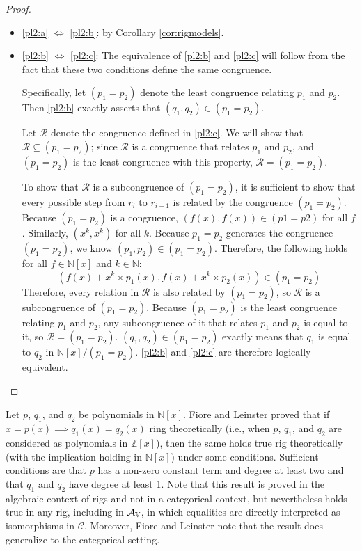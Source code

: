 \documentclass{msthesis}
\theoremstyle{definition}
\newcommand{\nat}{\mathbb{N}}
\newcommand{\mcC}{\mathcal{C}}
\begin{document}
\begin{proof} \hfill
    \begin{itemize}[nosep]
\item \ref{pl2:a} $\iff$ \ref{pl2:b}: by Corollary \ref{cor:rigmodels}.
\item \ref{pl2:b} $\iff$ \ref{pl2:c}: The equivalence of \ref{pl2:b} and \ref{pl2:c} will follow from the fact that these two conditions define the same congruence.

   Specifically, let $(p_1 = p_2)$ denote the least congruence relating $p_1$ and $p_2$. Then \ref{pl2:b} exactly asserts that $(q_1,q_2) \in (p_1=p_2)$.

   Let $\mathcal{R}$ denote the congruence defined in \ref{pl2:c}. We will show that $\mathcal{R} \subseteq (p_1=p_2)$; since $\mathcal{R}$ is a congruence that relates $p_1$ and $p_2$, and $(p_1 = p_2)$ is the least congruence with this property, $\mathcal{R} = (p_1 = p_2)$.
   
    To show that $\mathcal{R}$ is a subcongruence of $(p_1 = p_2)$, it is sufficient to show that every possible step from $r_i$ to $r_{i+1}$ is related by the congruence $(p_1 = p_2)$.  Because $(p_1 = p_2)$ is a congruence, $(f(x), f(x)) \in (p1 = p2)$ for all $f$.  Similarly, $(x^k, x^k)$ for all $k$. Because $p_1 = p_2$ generates the congruence $(p_1 = p_2)$, we know $(p_1, p_2) \in (p_1 = p_2)$. Therefore, the following holds for all $f \in \nat[x]$ and $k \in \nat$:
    \[ (f(x) + x^k\times p_1(x) , f(x) + x^k \times p_2(x)) \in (p_1 = p_2) \]
    Therefore, every relation in $\mathcal{R}$ is also related by $(p_1 = p_2)$, so $\mathcal{R}$ is a subcongruence of $(p_1 = p_2)$.  Because $(p_1 = p_2)$ is the least congruence relating $p_1$ and $p_2$, any subcongruence of it that relates $p_1$ and $p_2$ is equal to it, so $\mathcal{R} = (p_1 = p_2)$. $(q_1, q_2) \in (p_1 = p_2)$ exactly means that $q_1$ is equal to $q_2$ in $\nat[x]/(p_1 = p_2)$.  \ref{pl2:b} and \ref{pl2:c} are therefore logically equivalent. \qedhere    
\end{itemize}
\end{proof}

Let $p$, $q_1$, and $q_2$ be polynomials in $\nat[x]$. Fiore and Leinster proved that if $x = p(x) \implies q_1(x) = q_2(x)$ ring theoretically (i.e., when $p$, $q_1$, and $q_2$ are considered as polynomials in $\mathbb{Z}[x]$), then the same holds true rig theoretically (with the implication holding in $\nat[x]$) under some conditions.
Sufficient conditions are that $p$ has a non-zero constant term and degree at least two and that $q_1$ and $q_2$ have degree at least 1.  Note that this result is proved in the algebraic context of rigs and not in a categorical context, but nevertheless holds true in any rig, including in $\mathcal{A}_{\mathbb{V}}$, in which equalities are directly interpreted as isomorphisms in $\mcC$.
Moreover, Fiore and Leinster note that the result does generalize to the categorical setting.
\end{document}
